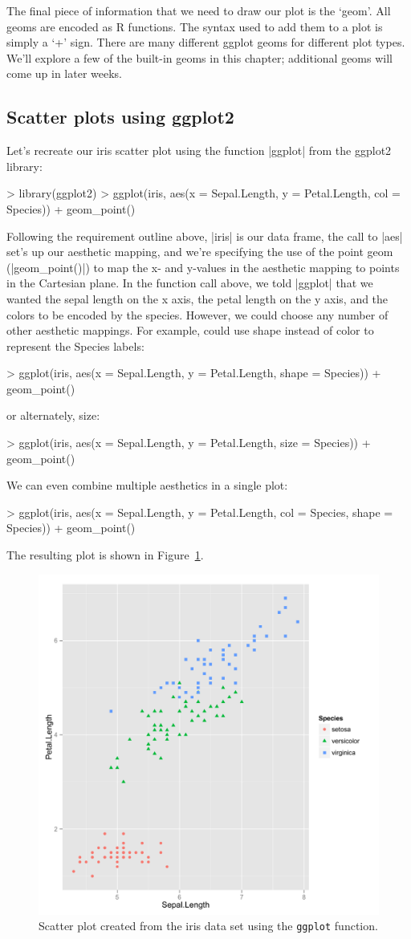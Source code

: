The final piece of information that we need to draw our plot is the `geom'. All geoms are encoded as R functions. The syntax used to add them to a plot is simply a `+' sign.  There are many different ggplot geoms for different plot types. We'll explore a few of the built-in geoms in this chapter; additional geoms will come up in later weeks.


\subsection{Scatter plots using ggplot2}

Let's recreate our iris scatter plot using the function |ggplot| from the ggplot2 library:
\begin{R}
> library(ggplot2)
> ggplot(iris, aes(x = Sepal.Length, y = Petal.Length, 
                col = Species)) + geom_point()
\end{R}
%
Following the requirement outline above, |iris| is our data frame, the call to |aes| set's up our aesthetic mapping, and we're specifying the use of the point geom (|geom_point()|) to map the x- and y-values in the aesthetic mapping to points in the Cartesian plane. In the function call above, we told |ggplot| that we wanted the sepal length on the x axis, the petal length on the y axis, and the colors to be encoded by the species. However, we could choose any number of other aesthetic mappings. For example, could use shape instead of color to represent the Species labels:
\begin{R}
> ggplot(iris, aes(x = Sepal.Length, y = Petal.Length, 
                shape = Species)) + geom_point()
\end{R}
%
or alternately, size:
%
\begin{R}
> ggplot(iris, aes(x = Sepal.Length, y = Petal.Length, 
                size = Species)) + geom_point()
\end{R}
%
We can even combine multiple aesthetics in a single plot:
%
\begin{R}
> ggplot(iris, aes(x = Sepal.Length, y = Petal.Length, 
                col = Species, shape = Species)) + geom_point()
\end{R}
The resulting plot is shown in Figure~\ref{fig:ggplotscatter}.
%
\begin{figure}[htbp]
\centering
\includegraphics[width=0.5\columnwidth]{./figures/hands-on2/ggplot-scatter.pdf}
\caption{Scatter plot created from the iris data set using the \lstinline!ggplot! function.}
\label{fig:ggplotscatter}
\end{figure}


